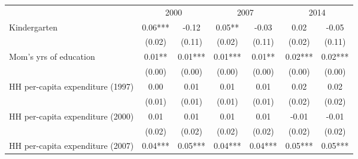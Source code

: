 \begin{tabular}{lllllll}
\cline{1-7}
\multicolumn{1}{c}{} &
  \multicolumn{2}{c}{2000} &
  \multicolumn{2}{c}{2007} &
  \multicolumn{2}{c}{2014}  \\
\cline{1-7}
\multicolumn{1}{l}{Kindergarten} &
  \multicolumn{1}{c}{0.06***} &
  \multicolumn{1}{c}{-0.12 } &
  \multicolumn{1}{c}{0.05** } &
  \multicolumn{1}{c}{-0.03 } &
  \multicolumn{1}{c}{0.02 } &
  \multicolumn{1}{c}{-0.05 } \\
\multicolumn{1}{l}{} &
  \multicolumn{1}{c}{(0.02)} &
  \multicolumn{1}{c}{(0.11)} &
  \multicolumn{1}{c}{(0.02)} &
  \multicolumn{1}{c}{(0.11)} &
  \multicolumn{1}{c}{(0.02)} &
  \multicolumn{1}{c}{(0.11)} \\
\multicolumn{1}{l}{Mom's yrs of education} &
  \multicolumn{1}{c}{0.01** } &
  \multicolumn{1}{c}{0.01***} &
  \multicolumn{1}{c}{0.01***} &
  \multicolumn{1}{c}{0.01** } &
  \multicolumn{1}{c}{0.02***} &
  \multicolumn{1}{c}{0.02***} \\
\multicolumn{1}{l}{} &
  \multicolumn{1}{c}{(0.00)} &
  \multicolumn{1}{c}{(0.00)} &
  \multicolumn{1}{c}{(0.00)} &
  \multicolumn{1}{c}{(0.00)} &
  \multicolumn{1}{c}{(0.00)} &
  \multicolumn{1}{c}{(0.00)} \\
\multicolumn{1}{l}{HH per-capita expenditure (1997)} &
  \multicolumn{1}{c}{0.00 } &
  \multicolumn{1}{c}{0.01 } &
  \multicolumn{1}{c}{0.01 } &
  \multicolumn{1}{c}{0.01 } &
  \multicolumn{1}{c}{0.02 } &
  \multicolumn{1}{c}{0.02 } \\
\multicolumn{1}{l}{} &
  \multicolumn{1}{c}{(0.01)} &
  \multicolumn{1}{c}{(0.01)} &
  \multicolumn{1}{c}{(0.01)} &
  \multicolumn{1}{c}{(0.01)} &
  \multicolumn{1}{c}{(0.02)} &
  \multicolumn{1}{c}{(0.02)} \\
\multicolumn{1}{l}{HH per-capita expenditure (2000)} &
  \multicolumn{1}{c}{0.01 } &
  \multicolumn{1}{c}{0.01 } &
  \multicolumn{1}{c}{0.01 } &
  \multicolumn{1}{c}{0.01 } &
  \multicolumn{1}{c}{-0.01 } &
  \multicolumn{1}{c}{-0.01 } \\
\multicolumn{1}{l}{} &
  \multicolumn{1}{c}{(0.02)} &
  \multicolumn{1}{c}{(0.02)} &
  \multicolumn{1}{c}{(0.02)} &
  \multicolumn{1}{c}{(0.02)} &
  \multicolumn{1}{c}{(0.02)} &
  \multicolumn{1}{c}{(0.02)} \\
\multicolumn{1}{l}{HH per-capita expenditure (2007)} &
  \multicolumn{1}{c}{0.04***} &
  \multicolumn{1}{c}{0.05***} &
  \multicolumn{1}{c}{0.04***} &
  \multicolumn{1}{c}{0.04***} &
  \multicolumn{1}{c}{0.05***} &
  \multicolumn{1}{c}{0.05***} \\

\end{tabular}
